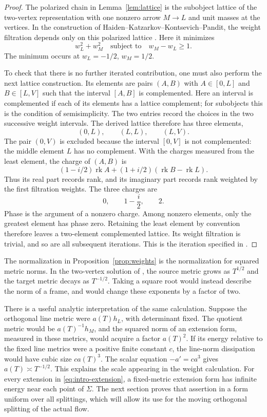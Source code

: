 \documentclass[11pt]{amsart}
\theoremstyle{definition}
\theoremstyle{remark}
\newcommand{\rk}{\operatorname{rk}}
\begin{document}
\begin{proof}
The polarized chain in Lemma~\ref{lem:lattice} is the subobject lattice
of the two-vertex representation with one nonzero arrow $M\to L$ and
unit masses at the vertices. In the construction of
Haiden--Katzarkov--Kontsevich--Pandit, the weight filtration depends only
on this polarized lattice \cite[\S\S3.1,3.3,4.3]{hkkp2023}.
Here it minimizes
\[
 w_L^2+w_M^2\quad\text{subject to}\quad w_M-w_L\ge1.
\]
The minimum occurs at $w_L=-1/2$, $w_M=1/2$.

To check that there is no further iterated contribution, one must also
perform the next lattice construction. Its elements are pairs $(A,B)$
with $A\in[0,L]$ and $B\in[L,V]$ such that the interval $[A,B]$ is
complemented. Here an interval is complemented if each of its elements
has a lattice complement; for subobjects this is the condition of
semisimplicity. The two entries record the choices in the two successive
weight intervals. The derived lattice therefore has three elements,
\[
 (0,L),\qquad (L,L),\qquad (L,V).
\]
The pair $(0,V)$ is excluded because the interval $[0,V]$ is not
complemented: the middle element $L$ has no complement. With the charges
measured from the least element, the charge of $(A,B)$ is
\[
 (1-i/2)\rk A+(1+i/2)(\rk B-\rk L).
\]
Thus its real part records rank, and its imaginary part records rank
weighted by the first filtration weights. The three charges are
\[
 0,\qquad 1-\frac{i}{2},\qquad 2.
\]
Phase is the argument of a nonzero charge. Among nonzero elements,
only the greatest element has phase zero. Retaining the least element
by convention therefore leaves a two-element complemented lattice. Its weight filtration is
trivial, and so are all subsequent iterations. This is the iteration
specified in \cite[\S\S4.4--4.5]{hkkp2023}.
\end{proof}

The normalization in Proposition~\ref{prop:weights} is the normalization
for squared metric norms. In the two-vertex solution of
\cite[Example~5.12, equations~(5.104)--(5.106)]{hkkp2023}, the source
metric grows as $T^{1/2}$ and the target metric decays as $T^{-1/2}$.
Taking a square root would instead describe the norm of a frame, and
would change these exponents by a factor of two.

There is a useful analytic interpretation of the same calculation.
Suppose the orthogonal line metric were $a(T)h_L$, with determinant fixed.
The quotient metric would be $a(T)^{-1}h_M$, and the squared norm of an
extension form, measured in these metrics, would acquire a factor $a(T)^2$.
If its energy relative to the fixed line metrics were a positive finite
constant $c$, the line-norm dissipation would have cubic size $ca(T)^3$.
The scalar equation $-a'=ca^3$ gives $a(T)\asymp T^{-1/2}$.
This explains the scale appearing in the weight calculation. For every extension in \eqref{eq:intro-extension}, a fixed-metric
extension form has infinite energy near each point of $\Sigma$.
The next section proves that assertion in a form uniform over all
splittings, which will allow its use for the moving orthogonal splitting
of the actual flow.
\end{document}
